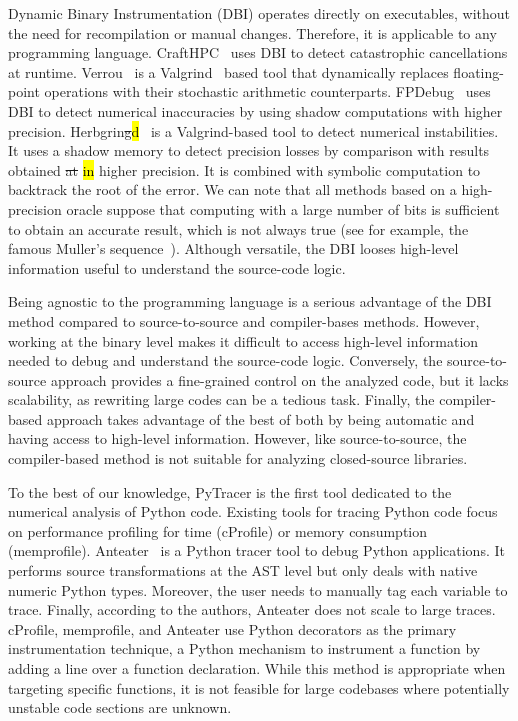 \documentclass[10pt,journal,compsoc]{IEEEtran}
\newcommand{\pytracer}[0]{PyTracer\xspace}
\DeclareRobustCommand{\add}[1]{\sethlcolor{lightgreen}\hl{#1}}
\DeclareRobustCommand{\remove}[1]{\textcolor{lightred}{\sout{#1}}}
\begin{document}
Dynamic Binary Instrumentation (DBI) operates directly on executables, without
the need for recompilation or manual changes. Therefore, it is applicable to any
programming language. CraftHPC~\cite{lam2013dynamic} uses DBI to detect
catastrophic cancellations at runtime. Verrou~\cite{fevotte2016verrou} is a
Valgrind~\cite{nethercote2007valgrind} based tool that dynamically replaces
floating-point operations with their stochastic arithmetic counterparts.
FPDebug~\cite{benz2012dynamic} uses DBI to detect numerical inaccuracies by
using shadow computations with higher precision.
Herbgrin\remove{g}\add{d}~\cite{sanchez2017finding} is a Valgrind-based tool to
detect numerical instabilities. It uses a shadow memory to detect precision
losses by comparison with results obtained \remove{at} \add{in} higher
precision. It is combined with symbolic computation to backtrack the root of the
error. We can note that all methods based on a high-precision oracle suppose
that computing with a large number of bits is sufficient to obtain an accurate
result, which is not always true (see for example, the famous Muller's
sequence~\cite{bajard1996introduction}). Although versatile, the DBI looses
high-level information useful to understand the source-code logic.

Being agnostic to the programming language is a serious advantage of the DBI
method compared to source-to-source and compiler-bases methods. However, working
at the binary level makes it difficult to access high-level information needed
to debug and understand the source-code logic. Conversely, the source-to-source
approach provides a fine-grained control on the analyzed code, but it lacks
scalability, as rewriting large codes can be a tedious task. Finally, the
compiler-based approach takes advantage of the best of both by being automatic
and having access to high-level information. However, like source-to-source, the
compiler-based method is not suitable for analyzing closed-source libraries.

To the best of our knowledge, \pytracer is the first tool dedicated to the
numerical analysis of Python code. Existing tools for tracing Python code focus
on performance profiling for time (cProfile) or memory consumption (memprofile).
Anteater~\cite{faust2019anteater} is a Python tracer tool to debug Python
applications. It performs source transformations at the AST level but only deals
with native numeric Python types. Moreover, the user needs to manually tag each
variable to trace. Finally, according to the authors, Anteater does not scale to
large traces. cProfile, memprofile, and Anteater use Python decorators as the
primary instrumentation technique, a Python mechanism to instrument a function
by adding a line over a function declaration. While this method is appropriate
when targeting specific functions, it is not feasible for large codebases where
potentially unstable code sections are unknown.
\end{document}
